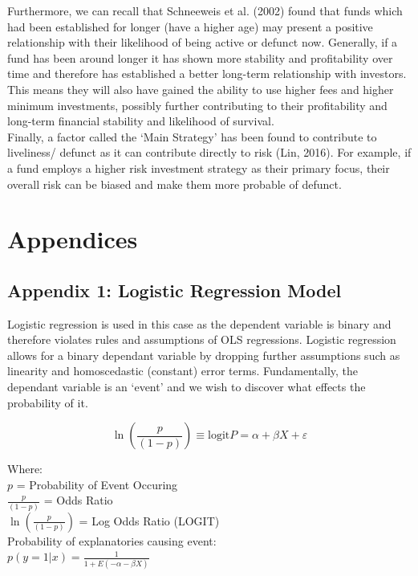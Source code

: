 \documentclass[11pt, english]{article}
\begin{document}
	Furthermore, we can recall that Schneeweis et al. (2002) found that funds which had been established for longer (have a higher age) may present a positive relationship with their likelihood of being active or defunct now. Generally, if a fund has been around longer it has shown more stability and profitability over time and therefore has established a better long-term relationship with investors. This means they will also have gained the ability to use higher fees and higher minimum investments, possibly further contributing to their profitability and long-term financial stability and likelihood of survival.\\

	Finally, a factor called the `Main Strategy' has been found to contribute to liveliness/ defunct as it can contribute directly to risk (Lin, 2016). For example, if a fund employs a higher risk investment strategy as their primary focus, their overall risk can be biased and make them more probable of defunct.

\newpage

\section*{Appendices}

	\subsection*{Appendix 1: Logistic Regression Model}

	Logistic regression is used in this case as the dependent variable is binary and therefore violates rules and assumptions of OLS regressions. Logistic regression allows for a binary dependant variable by dropping further assumptions such as linearity and homoscedastic (constant) error terms. Fundamentally, the dependant variable is an ‘event’ and we wish to discover what effects the probability of it.

	$$\ln\left(\frac{p}{(1-p)}\right)\equiv\mathrm{logit}P=\alpha+\beta X+\varepsilon$$

	Where:\\
	$p$ = Probability of Event Occuring\\
	$\frac{p}{(1-p)}$ = Odds Ratio\\
	$\ln\left(\frac{p}{(1-p)}\right)$ = Log Odds Ratio (LOGIT)\\

	Probability of explanatories causing event:\\
	$p(y=1|x)=\frac{1}{1+E(-\alpha-\beta X)}$\\
\end{document}
